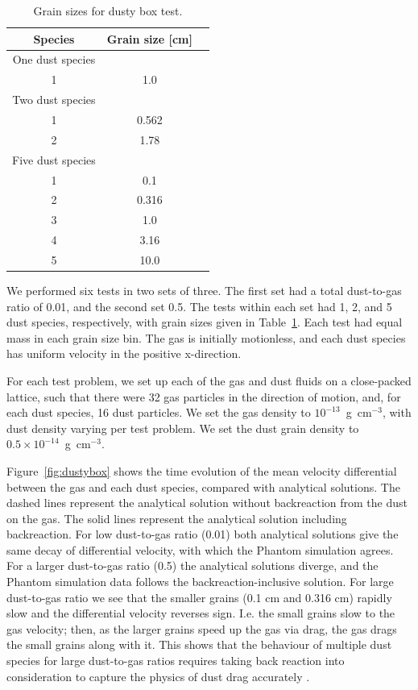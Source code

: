 \documentclass[fleqn,usenatbib]{mnras}
\begin{document}
\begin{table}
   \centering
   \begin{tabular}{ccc}
      \hline
      \hline
      Species & Grain size [cm] \\
      \hline
      \hline
      One dust species \\
      1 & 1.0 \\
      \hline
      Two dust species \\
      1 & 0.562 \\
      2 & 1.78 \\
      \hline
      Five dust species \\
      1 & 0.1 \\
      2 & 0.316 \\
      3 & 1.0 \\
      4 & 3.16 \\
      5 & 10.0 \\
      \hline
      \hline
   \end{tabular}
   \caption{Grain sizes for dusty box test.}
   \label{tab:dustybox}
\end{table}

We performed six tests in two sets of three. The first set had a total
dust-to-gas ratio of 0.01, and the second set 0.5. The tests within each set had
1, 2, and 5 dust species, respectively, with grain sizes given in
Table~\ref{tab:dustybox}. Each test had equal mass in each grain size bin. The
gas is initially motionless, and each dust species has uniform velocity in the
positive x-direction.

For each test problem, we set up each of the gas and dust fluids on a
close-packed lattice, such that there were 32 gas particles in the direction of
motion, and, for each dust species, 16 dust particles. We set the gas density to
\(10^{-13}\)~g~cm\({}^{-3}\), with dust density varying per test problem. We set
the dust grain density to \(0.5 \times 10^{-14}\)~g~cm\({}^{-3}\).

Figure~\ref{fig:dustybox} shows the time evolution of the mean velocity
differential between the gas and each dust species, compared with analytical
solutions. The dashed lines represent the analytical solution without
backreaction from the dust on the gas. The solid lines represent the analytical
solution including backreaction. For low dust-to-gas ratio (0.01) both
analytical solutions give the same decay of differential velocity, with which
the Phantom simulation agrees. For a larger dust-to-gas ratio (0.5) the
analytical solutions diverge, and the Phantom simulation data follows the
backreaction-inclusive solution. For large dust-to-gas ratio we see that the
smaller grains (0.1 cm and 0.316 cm) rapidly slow and the differential velocity
reverses sign. I.e. the small grains slow to the gas velocity; then, as the
larger grains speed up the gas via drag, the gas drags the small grains along
with it. This shows that the behaviour of multiple dust species for large
dust-to-gas ratios requires taking back reaction into consideration to capture
the physics of dust drag accurately
\citep{Gonzalez2017MNRAS.467.1984G,Dipierro2018MNRAS.479.4187D}.
\end{document}
